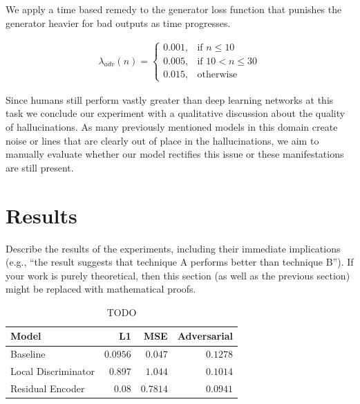 \documentclass{article}
\begin{document}
We apply a time based remedy to the generator loss function that punishes the generator heavier for bad outputs as time progresses.

\begin{align}
  \lambda_{adv}(n) = \begin{cases}
    0.001, & \text{if }n\leq10 \\
    0.005, & \text{if }10<n\leq30 \\
    0.015, & \text{otherwise}
  \end{cases}
\end{align}

Since humans still perform vastly greater than deep learning networks at this task we conclude our experiment with a qualitative discussion about the quality of hallucinations. As many previously mentioned models in this domain create noise or lines that are clearly out of place in the hallucinations, we aim to manually evaluate whether our model rectifies this issue or these manifestations are still present.

\section{Results}
Describe the results of the experiments, including their immediate implications (e.g., ``the result suggests that technique A performs better than technique B''). If your work is purely theoretical, then this section (as well as the previous section) might be replaced with mathematical proofs.

\begin{table}[h] 
  \centering  
    \begin{tabular}{lrrr}
    \hline
    \textbf{Model} & \textbf{L1} & \textbf{MSE} & \textbf{Adversarial}\\ 
    \hline \hline
      Baseline & $0.0956$ & $0.047$ & $0.1278$ \\
      Local Discriminator & $0.897$ & $1.044$ & $0.1014$ \\
      Residual Encoder & $0.08$ & $0.7814$ & $0.0941$ \\
    \hline
    \end{tabular}
  
  \caption{TODO} 
  \label{tab:4}
\end{table}
\end{document}
